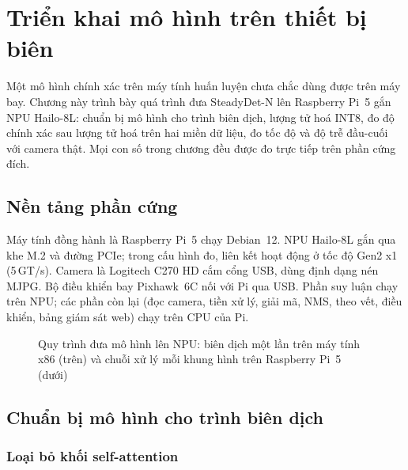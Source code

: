 \chapter{Triển khai mô hình trên thiết bị biên}
\label{chap:trienkhai}

Một mô hình chính xác trên máy tính huấn luyện chưa chắc dùng được trên máy bay. Chương này trình bày quá trình đưa SteadyDet-N lên Raspberry Pi~5 gắn NPU Hailo-8L: chuẩn bị mô hình cho trình biên dịch, lượng tử hoá INT8, đo độ chính xác sau lượng tử hoá trên hai miền dữ liệu, đo tốc độ và độ trễ đầu-cuối với camera thật. Mọi con số trong chương đều được đo trực tiếp trên phần cứng đích.

\section{Nền tảng phần cứng}

Máy tính đồng hành là Raspberry Pi~5 chạy Debian~12. NPU Hailo-8L gắn qua khe M.2 và đường PCIe; trong cấu hình đo, liên kết hoạt động ở tốc độ Gen2 x1 (5\,GT/s). Camera là Logitech C270 HD cắm cổng USB, dùng định dạng nén MJPG. Bộ điều khiển bay Pixhawk~6C nối với Pi qua USB. Phần suy luận chạy trên NPU; các phần còn lại (đọc camera, tiền xử lý, giải mã, NMS, theo vết, điều khiển, bảng giám sát web) chạy trên CPU của Pi.

\begin{figure}[H]
\centering
\resizebox{\textwidth}{!}{}
\caption{Quy trình đưa mô hình lên NPU: biên dịch một lần trên máy tính x86 (trên) và chuỗi xử lý mỗi khung hình trên Raspberry Pi~5 (dưới)}
\label{fig:quytrinhtrienkhai}
\end{figure}

\section{Chuẩn bị mô hình cho trình biên dịch}

\subsection{Loại bỏ khối self-attention}


